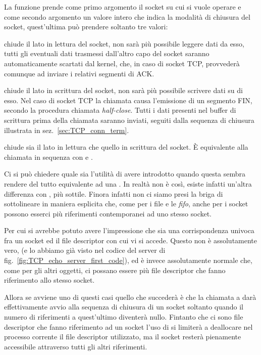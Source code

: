 La funzione prende come primo argomento il socket  su cui si
vuole operare e come secondo argomento un valore intero  che indica
la modalità di chiusura del socket, quest'ultima può prendere soltanto tre
valori: 
\begin{basedescript}{\desclabelwidth{2.2cm}\desclabelstyle{\nextlinelabel}}
\item[\constd{SHUT\_RD}] chiude il lato in lettura del socket, non sarà più
  possibile leggere dati da esso, tutti gli eventuali dati trasmessi
  dall'altro capo del socket saranno automaticamente scartati dal kernel, che,
  in caso di socket TCP, provvederà comunque ad inviare i relativi segmenti di
  ACK.
\item[\constd{SHUT\_WR}] chiude il lato in scrittura del socket, non sarà più
  possibile scrivere dati su di esso. Nel caso di socket TCP la chiamata causa
  l'emissione di un segmento FIN, secondo la procedura chiamata
  \textit{half-close}. Tutti i dati presenti nel buffer di scrittura prima
  della chiamata saranno inviati, seguiti dalla sequenza di chiusura
  illustrata in sez.~\ref{sec:TCP_conn_term}.
\item[\constd{SHUT\_RDWR}] chiude sia il lato in lettura che quello in
  scrittura del socket. È equivalente alla chiamata in sequenza con
   e .
\end{basedescript}


Ci si può chiedere quale sia l'utilità di avere introdotto 
quando questa sembra rendere  del tutto equivalente ad una
. In realtà non è così, esiste infatti un'altra differenza con
, più sottile. Finora infatti non ci siamo presi la briga di
sottolineare in maniera esplicita che, come per i file e le \textit{fifo},
anche per i socket possono esserci più riferimenti contemporanei ad uno stesso
socket. 

Per cui si avrebbe potuto avere l'impressione che sia una corrispondenza
univoca fra un socket ed il file descriptor con cui vi si accede. Questo non è
assolutamente vero, (e lo abbiamo già visto nel codice del server di
fig.~\ref{fig:TCP_echo_server_first_code}), ed è invece assolutamente normale
che, come per gli altri oggetti, ci possano essere più file descriptor che
fanno riferimento allo stesso socket.

Allora se avviene uno di questi casi quello che succederà è che la chiamata a
 darà effettivamente avvio alla sequenza di chiusura di un socket
soltanto quando il numero di riferimenti a quest'ultimo diventerà nullo.
Fintanto che ci sono file descriptor che fanno riferimento ad un socket l'uso
di  si limiterà a deallocare nel processo corrente il file
descriptor utilizzato, ma il socket resterà pienamente accessibile attraverso
tutti gli altri riferimenti. 

